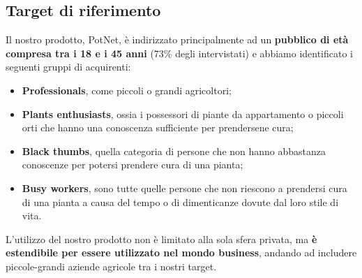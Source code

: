\subsection{Target di riferimento}

Il nostro prodotto, PotNet, è indirizzato principalmente ad un \textbf{pubblico di età compresa tra i 18 e i 45 anni} (73\% degli intervistati) e abbiamo identificato i seguenti gruppi di acquirenti:

\begin{itemize}
	\item \textbf{Professionals}, come piccoli o grandi agricoltori;
	
	\item \textbf{Plants enthusiasts}, ossia i possessori di piante da appartamento o piccoli orti che hanno una conoscenza sufficiente per prendersene cura;	
	
	\item \textbf{Black thumbs}, quella categoria di persone che non hanno abbastanza conoscenze per potersi prendere cura di una pianta;
	
	\item \textbf{Busy workers}, sono tutte quelle persone che non riescono a prendersi cura di una pianta a causa del tempo o di dimenticanze dovute dal loro stile di vita.
\end{itemize}

L’utilizzo del nostro prodotto non è limitato alla sola sfera privata, ma \textbf{è estendibile per essere utilizzato nel mondo business}, andando ad includere piccole-grandi aziende agricole tra i nostri target.